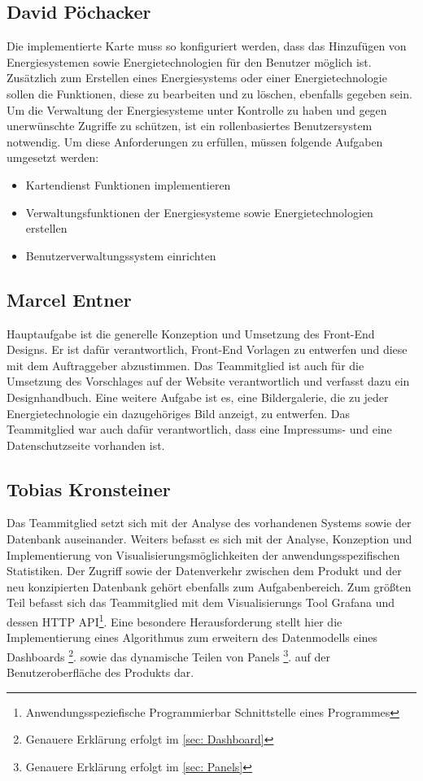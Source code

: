 \subsection{David Pöchacker}
Die implementierte Karte muss so konfiguriert werden, dass das Hinzufügen von Energiesystemen sowie Energietechnologien für den Benutzer möglich ist. Zusätzlich zum Erstellen eines Energiesystems oder einer Energietechnologie sollen die Funktionen, diese zu bearbeiten und zu löschen, ebenfalls gegeben sein. Um die Verwaltung der Energiesysteme unter Kontrolle zu haben und gegen unerwünschte Zugriffe zu schützen, ist ein rollenbasiertes Benutzersystem notwendig. Um diese Anforderungen zu erfüllen, müssen folgende Aufgaben umgesetzt werden:
\begin{itemize}
	\item Kartendienst Funktionen implementieren
	\item Verwaltungsfunktionen der Energiesysteme sowie Energietechnologien erstellen
	\item Benutzerverwaltungssystem einrichten
\end{itemize}

\newpage

\subsection{Marcel Entner}
Hauptaufgabe ist die generelle Konzeption und Umsetzung des Front-End Designs. Er ist dafür verantwortlich, Front-End Vorlagen zu entwerfen und diese mit dem Auftraggeber abzustimmen. Das Teammitglied ist auch für die Umsetzung des Vorschlages auf der Website verantwortlich und verfasst dazu ein Designhandbuch. Eine weitere Aufgabe ist es, eine Bildergalerie, die zu jeder Energietechnologie ein dazugehöriges Bild anzeigt, zu entwerfen. Das Teammitglied  war auch dafür verantwortlich, dass eine Impressums- und eine Datenschutzseite vorhanden ist. 

\subsection{Tobias Kronsteiner}
Das Teammitglied setzt sich mit der Analyse des vorhandenen Systems sowie der Datenbank auseinander. Weiters befasst es sich mit der Analyse, Konzeption und Implementierung von Visualisierungsmöglichkeiten der anwendungsspezifischen Statistiken. Der Zugriff sowie der Datenverkehr zwischen dem Produkt und der neu konzipierten Datenbank gehört ebenfalls zum Aufgabenbereich. Zum größten Teil befasst sich das Teammitglied mit dem Visualisierungs Tool Grafana und dessen HTTP API\footnote{Anwendungsspeziefische Programmierbar Schnittstelle eines Programmes }. 
Eine besondere Herausforderung stellt hier die Implementierung eines Algorithmus zum erweitern des Datenmodells eines Dashboards \footnote{ Genauere Erklärung erfolgt im \autoref{sec: Dashboard}}. sowie das dynamische Teilen von Panels \footnote{ Genauere Erklärung erfolgt im \autoref{sec: Panels}}. auf der Benutzeroberfläche des Produkts dar. 





